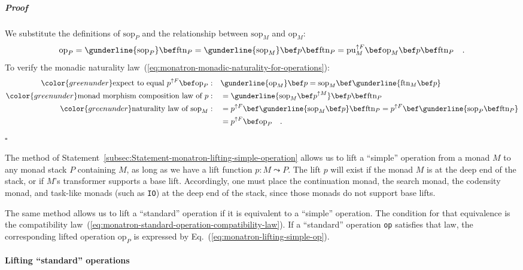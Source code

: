\subparagraph{Proof}

We substitute the definitions of $\text{sop}_{P}$ and the relationship
between $\text{sop}_{M}$ and $\text{op}_{M}$:
\[
\text{op}_{P}=\gunderline{\text{sop}_{P}}\bef\text{ftn}_{P}=\gunderline{\text{sop}_{M}}\bef p\bef\text{ftn}_{P}=\text{pu}_{M}^{\uparrow F}\bef\text{op}_{M}\bef p\bef\text{ftn}_{P}\quad.
\]
To verify the monadic naturality law~(\ref{eq:monatron-monadic-naturality-for-operations}):
\begin{align*}
{\color{greenunder}\text{expect to equal }p^{\uparrow F}\bef\text{op}_{P}:}\quad & \gunderline{\text{op}_{M}}\bef p=\text{sop}_{M}\bef\gunderline{\text{ftn}_{M}\bef p}\\
{\color{greenunder}\text{monad morphism composition law of }p:}\quad & =\gunderline{\text{sop}_{M}\bef p^{\uparrow M}}\bef p\bef\text{ftn}_{P}\\
{\color{greenunder}\text{naturality law of }\text{sop}_{M}:}\quad & =p^{\uparrow F}\bef\gunderline{\text{sop}_{M}\bef p}\bef\text{ftn}_{P}=p^{\uparrow F}\bef\gunderline{\text{sop}_{P}\bef\text{ftn}_{P}}\\
 & =p^{\uparrow F}\bef\text{op}_{P}\quad.
\end{align*}
$\square$

The method of Statement~\ref{subsec:Statement-monatron-lifting-simple-operation}
allows us to lift a \textsf{``}simple\textsf{''} operation from a monad $M$ to any
monad stack $P$ containing $M$, as long as we have a lift function
$p:M\leadsto P$. The lift $p$ will exist if the monad $M$ is at
the deep end of the stack, or if $M$\textsf{'}s transformer supports a base
lift. Accordingly, one must place the continuation monad, the search
monad, the codensity monad, and task-like monads (such as \lstinline!IO!)
at the deep end of the stack, since those monads do not support base
lifts.

The same method allows us to lift a \textsf{``}standard\textsf{''} operation if it
is equivalent to a \textsf{``}simple\textsf{''} operation. The condition for that
equivalence is the compatibility law~(\ref{eq:monatron-standard-operation-compatibility-law}).
If a \textsf{``}standard\textsf{''} operation \lstinline!op! satisfies that law,
the corresponding lifted operation $\text{op}_{P}$ is expressed by
Eq.~(\ref{eq:monatron-lifting-simple-op}).

\paragraph{Lifting \textquotedblleft standard\textquotedblright{} operations}

